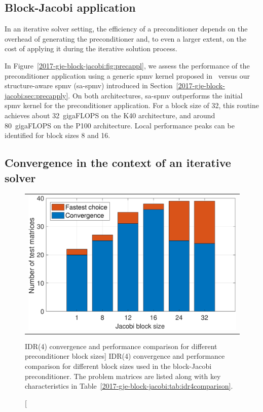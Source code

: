 \subsection{Block-Jacobi application}


In an iterative solver setting, the efficiency of a preconditioner depends on
the overhead of generating the preconditioner and, to even a larger extent, on
the cost of applying it during the iterative solution process.

In Figure~\ref{2017-gje-block-jacobi:fig:precappl}, we assess the performance of the preconditioner
application using a generic {\sc spmv} kernel proposed
in~\cite{Anzt:2017:BGE:3026937.3026940} versus our structure-aware {\sc spmv}
({\sc sa-spmv}) introduced in Section~\ref{2017-gje-block-jacobi:sec:precapply}. On both architectures,
{\sc sa-spmv} outperforms the initial {\sc spmv} kernel for the preconditioner
application. For a block size of 32, this routine achieves about 32~gigaFLOPS on the K40
architecture, and around 80~gigaFLOPS on the P100 architecture. Local performance peaks
can be identified for block sizes 8 and 16.

\subsection{Convergence in the context of an iterative solver}
\begin{figure}[t]
\begin{center}
\begin{tabular}{c}
\includegraphics[width=.46\columnwidth]{plots/solverperformance_bs.pdf}
\end{tabular}
\end{center}
\caption
[IDR(4) convergence and performance comparison for different preconditioner
block sizes]
{
IDR(4) convergence and performance comparison for different block sizes used in the block-Jacobi preconditioner. 
The problem matrices are listed along with key characteristics in Table~\ref{2017-gje-block-jacobi:tab:idr4comparison}.
}
\label{2017-gje-block-jacobi:fig:solverperformance}
\end{figure}

